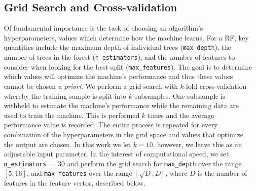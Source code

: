 \subsection{Grid Search and Cross-validation}
Of fundamental importance is the task of choosing an algorithm's hyperparameters, 
values which determine how the machine learns.   For a RF, key quantities include
 the maximum depth of individual trees (\texttt{max\_depth}), the number of trees
in the forest (\texttt{n\_estimators}), and the number of features to consider when 
looking for the best split (\texttt{max\_features}). 
The goal is to determine which values will optimize 
the machine's performance and thus these values cannot be chosen \textit{a priori}. 
We perform a grid search with $k$-fold cross-validation whereby the 
training sample is split into $k$ subsamples. One subsample is withheld to 
estimate the machine's performance while the remaining data are used to train the machine. 
This is performed $k$ times and the average performance
value is recorded. The entire process is repeated for every combination of the 
 hyperparameters in the grid space and values that optimize the output are chosen. 
In this work we let $k=10$, however, we leave this as an adjustable input parameter.
In the interest of computational speed, we set \texttt{n\_estimators} $=30$ and 
perform the grid search for \texttt{max\_depth} over the range $[5,16]$, and 
\texttt{max\_features} over the range $[\sqrt{D}, D]$,
where $D$ is the number of features in the feature vector, described below.
 

